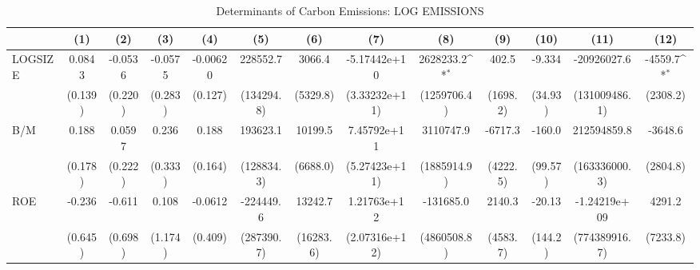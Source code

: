 \begin{table}[htbp]\centering
\def\sym#1{\ifmmode^{#1}\else\(^{#1}\)\fi}
\caption{Determinants of Carbon Emissions: LOG EMISSIONS}
\begin{tabular}{l*{12}{c}}
\hline\hline
                    &\multicolumn{1}{c}{(1)}         &\multicolumn{1}{c}{(2)}         &\multicolumn{1}{c}{(3)}         &\multicolumn{1}{c}{(4)}         &\multicolumn{1}{c}{(5)}         &\multicolumn{1}{c}{(6)}         &\multicolumn{1}{c}{(7)}         &\multicolumn{1}{c}{(8)}         &\multicolumn{1}{c}{(9)}         &\multicolumn{1}{c}{(10)}         &\multicolumn{1}{c}{(11)}         &\multicolumn{1}{c}{(12)}         \\
\hline
LOGSIZE             &      0.0843         &     -0.0536         &     -0.0575         &    -0.00620         &    228552.7         &      3066.4         &-5.17442e+10         &   2628233.2\sym{*}  &       402.5         &      -9.334         & -20926027.6         &     -4559.7\sym{*}  \\
                    &     (0.139)         &     (0.220)         &     (0.283)         &     (0.127)         &  (134294.8)         &    (5329.8)         &(3.33232e+11)         & (1259706.4)         &    (1698.2)         &     (34.93)         &(131009486.1)         &    (2308.2)         \\
B/M                 &       0.188         &      0.0597         &       0.236         &       0.188         &    193623.1         &     10199.5         & 7.45792e+11         &   3110747.9         &     -6717.3         &      -160.0         & 212594859.8         &     -3648.6         \\
                    &     (0.178)         &     (0.222)         &     (0.333)         &     (0.164)         &  (128834.3)         &    (6688.0)         &(5.27423e+11)         & (1885914.9)         &    (4222.5)         &     (99.57)         &(163336000.3)         &    (2804.8)         \\
ROE                 &      -0.236         &      -0.611         &       0.108         &     -0.0612         &   -224449.6         &     13242.7         & 1.21763e+12         &   -131685.0         &      2140.3         &      -20.13         &-1.24219e+09         &      4291.2         \\
                    &     (0.645)         &     (0.698)         &     (1.174)         &     (0.409)         &  (287390.7)         &   (16283.6)         &(2.07316e+12)         & (4860508.8)         &    (4583.7)         &     (144.2)         &(774389916.7)         &    (7233.8)         \\

\end{tabular}
\end{table}
